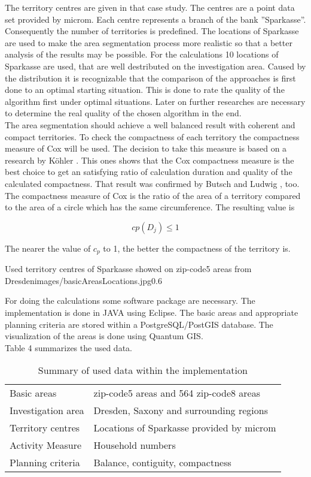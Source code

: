 The territory centres are given in that case study. The centres are a point data set provided by microm. Each centre represents a branch of the bank ''Sparkasse''. Consequently the number of territories is predefined. The locations of Sparkasse are used to make the area segmentation process more realistic so that a better analysis of the results may be possible. For the calculations 10 locations of Sparkasse are used, that are well destributed on the investigation area. Caused by the distribution it is recognizable that the comparison of the approaches is first done to an optimal starting situation. This is done to rate the quality of the algorithm first under optimal situations. Later on further researches are necessary to determine the real quality of the chosen algorithm in the end. \\
The area segmentation should achieve a well balanced result with coherent and compact territories. To check the compactness of each territory the compactness measure of Cox will be used. The decision to take this measure is based on a research by Köhler \cite{koehler}. This ones shows that the Cox compactness measure is the best choice to get an satisfying ratio of calculation duration and quality of the calculated compactness. That result was confirmed by Butsch and Ludwig \cite{kit_com}, too. The compactness measure of Cox is the ratio of the area of a territory compared to the area of a circle which has the same circumference. The resulting value is

\[ \mathit{cp(D_{j})  \leq   1}\]


The nearer the value of $c_{p}$ to 1, the better the compactness of the territory is.

\begin{figurevarSize}{Used territory centres of Sparkasse showed on zip-code5 areas from Dresden}{images/basicAreasLocations.jpg}{0.6}\end{figurevarSize}

For doing the calculations some software package are necessary. The implementation is done in JAVA using Eclipse. The basic areas and appropriate planning criteria are stored within a PostgreSQL/PostGIS database. The visualization of the areas is done using Quantum GIS. \\
Table 4 summarizes the used data.



\begin{table}[H]
	\begin{tabular}{|p{3.5cm}|>{\RaggedRight}p{9.5cm}|}
		\hline
		& \centering{Detailed information} \tabularnewline
		\hline
		Basic areas & 37 zip-code5 areas and 564 zip-code8 areas
		\tabularnewline
		\hline
		Investigation area & Dresden, Saxony and surrounding regions
		\tabularnewline
		\hline
		Territory centres & Locations of Sparkasse provided by microm
		\tabularnewline
		\hline
		Activity Measure & Household numbers
		\tabularnewline
		\hline
		Planning criteria & Balance, contiguity, compactness
		\tabularnewline
		\hline
	\end{tabular}
	\caption{Summary of used data within the implementation}
\end{table}


